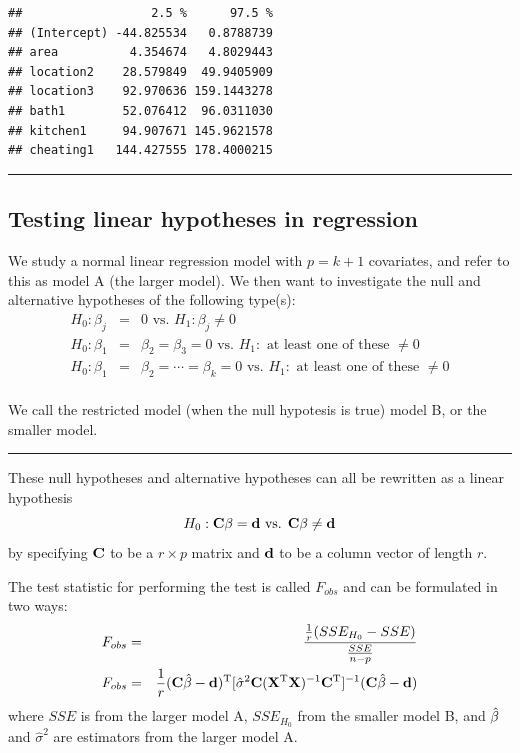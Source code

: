 \documentclass[
]{article}
\begin{document}
\begin{verbatim}
##                  2.5 %      97.5 %
## (Intercept) -44.825534   0.8788739
## area          4.354674   4.8029443
## location2    28.579849  49.9405909
## location3    92.970636 159.1443278
## bath1        52.076412  96.0311030
## kitchen1     94.907671 145.9621578
## cheating1   144.427555 178.4000215
\end{verbatim}

\begin{center}\rule{0.5\linewidth}{0.5pt}\end{center}

\hypertarget{testing-linear-hypotheses-in-regression}{%
\subsection{Testing linear hypotheses in
regression}\label{testing-linear-hypotheses-in-regression}}

We study a normal linear regression model with \(p=k+1\) covariates, and
refer to this as model A (the larger model). We then want to investigate
the null and alternative hypotheses of the following type(s):
\begin{eqnarray*}
 H_0: \beta_{j}&=&0 \text{ vs. } H_1:\beta_j\neq 0\\
 H_0: \beta_{1}&=&\beta_{2}=\beta_{3}=0 \text{ vs. } H_1:\text{ at least one of these }\neq 0\\
 H_0: \beta_{1}&=&\beta_{2}=\cdots=\beta_{k}=0 \text{ vs. } H_1:\text{ at least one of these }\neq 0\\
 \end{eqnarray*}

We call the restricted model (when the null hypotesis is true) model B,
or the smaller model.

\begin{center}\rule{0.5\linewidth}{0.5pt}\end{center}

These null hypotheses and alternative hypotheses can all be rewritten as
a linear hypothesis
\[H_0: {\bf C}{\bf \beta}={\bf d} \text{ vs. } {\bf C}{\bf \beta}\neq {\bf d} \]
by specifying \({\bf C}\) to be a \(r \times p\) matrix and \({\bf d}\)
to be a column vector of length \(r\).

The test statistic for performing the test is called \(F_{obs}\) and can
be formulated in two ways: \begin{eqnarray}
F_{obs}&=&\frac{\frac{1}{r} (SSE_{H_0}-SSE)}{\frac{SSE}{n-p}} \label{Fobsnested}\\
F_{obs}&=&\frac{1}{r}({\bf C}\hat{{\bf \beta}}-{\bf d})^{\text T}[\hat{\sigma}^2 {\bf C}({\bf X}^{\text T}{\bf X})^{-1}{\bf C}^{\text T}]^{-1}({\bf C}\hat{{\bf \beta}}-{\bf d}) \label{FobsCbeta}
\end{eqnarray} where \(SSE\) is from the larger model A, \(SSE_{H_0}\)
from the smaller model B, and \(\hat{{\bf \beta}}\) and
\(\hat{\sigma}^2\) are estimators from the larger model A.
\end{document}
